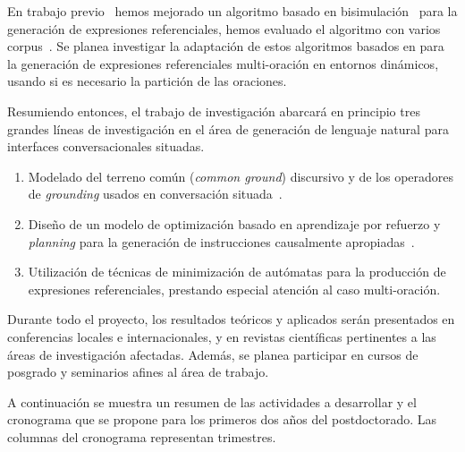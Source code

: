 \documentclass[10.9pt,a4paper]{article}
\begin{document}
En trabajo previo~\citep{altamirano-areces-benotti:2012:POSTERS} hemos mejorado un algoritmo basado en 
bisimulaci\'on~\citep{arec:refe08} para la generaci\'on de expresiones referenciales, hemos evaluado el algoritmo con varios corpus~\citep{altamirano-areces-benotti:2012:POSTERS, beno:context2013}. Se planea investigar la adaptaci\'on de estos algoritmos basados en para la generaci\'on de expresiones referenciales multi-oraci\'on en entornos din\'amicos, usando si es necesario la partici\'on de las oraciones.

Resumiendo entonces, el trabajo de investigaci\'on abarcar\'a en principio tres grandes l\'ineas 
de investigaci\'on en el \'area de generaci\'on de lenguaje natural para interfaces conversacionales 
situadas.
\begin{enumerate}

    \item Modelado del terreno com\'un (\emph{common ground}) 
    discursivo y de los operadores de \emph{grounding} usados en 
    conversaci\'on situada~\citep{benotti-EtAl:2012:ACL2012short}.

    \item Dise\~no de un modelo de optimizaci\'on basado en aprendizaje 
    por refuerzo y \emph{planning} para la generaci\'on de instrucciones 
    causalmente apropiadas~\citep{beno:acl11}.

    \item Utilizaci\'on de t\'ecnicas de minimizaci\'on de aut\'omatas para la 
    producci\'on de expresiones referenciales, prestando especial atenci\'on 
    al caso multi-oraci\'on.

\end{enumerate}

Durante todo el proyecto, los resultados te\'oricos y aplicados ser\'an 
presentados en conferencias locales e internacionales, y en revistas 
cient\'ificas pertinentes a las \'areas de investigaci\'on afectadas.
Adem\'as, se planea participar en cursos de posgrado y seminarios afines
al \'area de trabajo. 

A continuaci\'on se muestra un resumen de las actividades a desarrollar y 
el cronograma que se propone para los primeros dos a\~nos del postdoctorado.
Las columnas del cronograma representan trimestres.
\end{document}
